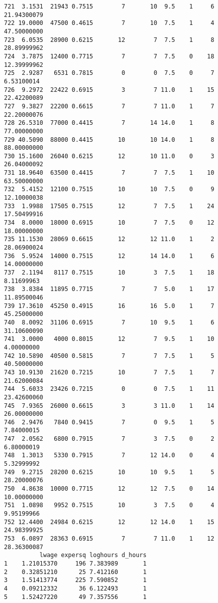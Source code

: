 \documentclass[
  letterpaper,
  DIV=11,
  numbers=noendperiod]{scrreprt}
\begin{document}
\begin{verbatim}
721  3.1531  21943 0.7515        7       10  9.5    1     6 21.94300079
722 19.0000  47500 0.4615        7       10  7.5    1     4 47.50000000
723  6.0535  28900 0.6215       12        7  7.5    1     8 28.89999962
724  3.7875  12400 0.7715        7        7  7.5    0    18 12.39999962
725  2.9287   6531 0.7815        0        0  7.5    0     7  6.53100014
726  9.2972  22422 0.6915        3        7 11.0    1    15 22.42200089
727  9.3827  22200 0.6615        7        7 11.0    1     7 22.20000076
728 26.5310  77000 0.4415        7       14 14.0    1     8 77.00000000
729 40.5090  88000 0.4415       10       10 14.0    1     8 88.00000000
730 15.1600  26040 0.6215       12       10 11.0    0     3 26.04000092
731 18.9640  63500 0.4415        7        7  7.5    1    10 63.50000000
732  5.4152  12100 0.7515       10       10  7.5    0     9 12.10000038
733  1.9988  17505 0.7515       12        7  7.5    1    24 17.50499916
734  8.0000  18000 0.6915       10        7  7.5    0    12 18.00000000
735 11.1530  28069 0.6615       12       12 11.0    1     2 28.06900024
736  5.9524  14000 0.7515       12       14 14.0    1     6 14.00000000
737  2.1194   8117 0.7515       10        3  7.5    1    18  8.11699963
738  3.8384  11895 0.7715        7        7  5.0    1    17 11.89500046
739 17.3610  45250 0.4915       16       16  5.0    1     7 45.25000000
740  8.0092  31106 0.6915        7       10  9.5    1     6 31.10600090
741  3.0000   4000 0.8015       12        7  9.5    1    10  4.00000000
742 10.5890  40500 0.5815        7        7  7.5    1     5 40.50000000
743 10.9130  21620 0.7215       10        7  7.5    1     7 21.62000084
744  5.6033  23426 0.7215        0        0  7.5    1    11 23.42600060
745  7.9365  26000 0.6615        3        3 11.0    1    14 26.00000000
746  2.9476   7840 0.9415        7        0  9.5    1     5  7.84000015
747  2.0562   6800 0.7915        7        3  7.5    0     2  6.80000019
748  1.3013   5330 0.7915        7       12 14.0    0     4  5.32999992
749  9.2715  28200 0.6215       10       10  9.5    1     5 28.20000076
750  4.8638  10000 0.7715       12       12  7.5    0    14 10.00000000
751  1.0898   9952 0.7515       10        3  7.5    0     4  9.95199966
752 12.4400  24984 0.6215       12       12 14.0    1    15 24.98399925
753  6.0897  28363 0.6915        7        7 11.0    1    12 28.36300087
          lwage expersq loghours d_hours
1    1.21015370     196 7.383989       1
2    0.32851210      25 7.412160       1
3    1.51413774     225 7.590852       1
4    0.09212332      36 6.122493       1
5    1.52427220      49 7.357556       1

\end{verbatim}
\end{document}

